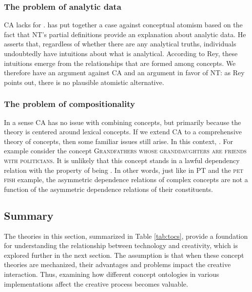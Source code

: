 \subsubsection*{The problem of analytic data}\label{sec:the-problem-of-analytic-data}
CA lacks for . \cite{Rey1993} has put together a case against conceptual atomism based on the fact that NT's partial definitions provide an explanation about analytic data. He asserts that, regardless of whether there are any analytical truths, individuals undoubtedly have intuitions about what is analytical. According to Rey, these intuitions emerge from the relationships that are formed among concepts. We therefore have an argument against CA and an argument in favor of NT: as Rey points out, there is no plausible atomistic alternative.

\subsubsection*{The problem of compositionality}
In a sense CA has no issue with combining concepts, but primarily because the theory is centered around lexical concepts. If we extend CA to a comprehensive theory of concepts, then some familiar issues still arise. In this context, . For example consider the concept \textsc{Grandfathers whose granddaughters are friends with politicians}. It is unlikely that this concept stands in a lawful dependency relation with the property of being . In other words, just like in PT and the \textsc{pet fish} example, the asymmetric dependence relations of complex concepts are not a function of the asymmetric dependence relations of their constituents.


\subsection{Summary}
The theories in this section, summarized in Table \ref{tab:tocs}, provide a foundation for understanding the relationship between technology and creativity, which is explored further in the next section. The assumption is that when these concept theories are mechanized, their advantages and problems impact the creative interaction. Thus, examining how different concept ontologies in various implementations affect the creative process becomes valuable.

